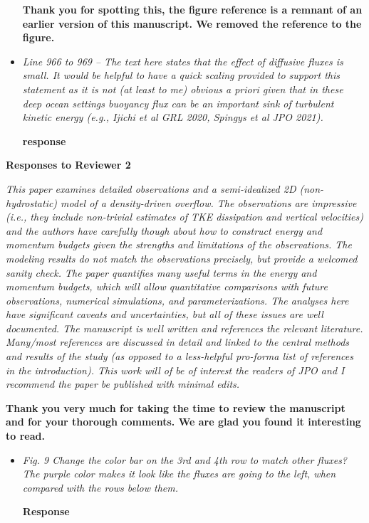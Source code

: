 \documentclass[11pt]{article}
\begin{document}
\begin{flushleft}
\begin{itemize}
\bf
Thank you for spotting this, the figure reference is a remnant of an earlier version of this manuscript. We removed the reference to the figure.

\item \it
Line 966 to 969 -- The text here states that the effect of diffusive fluxes is small. It would be helpful to have a quick scaling provided to support this statement as it is not (at least to me) obvious a priori given that in these deep ocean settings buoyancy flux can be an important sink of turbulent kinetic energy (e.g., Ijichi et al GRL 2020, Spingys et al JPO 2021).

\bf
response

\end{itemize}


\clearpage

\centerline{\bf Responses to Reviewer 2}
\vspace{0.05in}

\it 
This paper examines detailed observations and a semi-idealized 2D (non-hydrostatic) model of a density-driven overflow. The observations are impressive (i.e., they include non-trivial estimates of TKE dissipation and vertical velocities) and the authors have carefully though about how to construct energy and momentum budgets given the strengths and limitations of the observations. The modeling results do not match the observations precisely, but provide a welcomed sanity check. The paper quantifies many useful terms in the energy and momentum budgets, which will allow quantitative comparisons with future observations, numerical simulations, and parameterizations. The analyses here have significant caveats and uncertainties, but all of these issues are well documented. The manuscript is well written and references the relevant literature. Many/most references are discussed in detail and linked to the central methods and results of the study (as opposed to a less-helpful pro-forma list of references in the introduction). This work will of be of interest the readers of JPO and I recommend the paper be published with minimal edits.
\vspace{0.05in}

\bf
Thank you very much for taking the time to review the manuscript and for your thorough comments. We are glad you found it interesting to read.


\begin{itemize}

\item \it
Fig. 9 Change the color bar on the 3rd and 4th row to match other fluxes? The purple color makes it look like the fluxes are going to the left, when compared with the rows below them.

\bf
Response
\end{itemize}

\clearpage

\end{flushleft}
\end{document}
